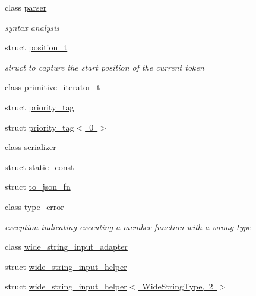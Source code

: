 \begin{DoxyCompactItemize}
class \mbox{\hyperlink{classnlohmann_1_1detail_1_1parser}{parser}}
\begin{DoxyCompactList}\small\item\em syntax analysis \end{DoxyCompactList}\item 
struct \mbox{\hyperlink{structnlohmann_1_1detail_1_1position__t}{position\+\_\+t}}
\begin{DoxyCompactList}\small\item\em struct to capture the start position of the current token \end{DoxyCompactList}\item 
class \mbox{\hyperlink{classnlohmann_1_1detail_1_1primitive__iterator__t}{primitive\+\_\+iterator\+\_\+t}}
\item 
struct \mbox{\hyperlink{structnlohmann_1_1detail_1_1priority__tag}{priority\+\_\+tag}}
\item 
struct \mbox{\hyperlink{structnlohmann_1_1detail_1_1priority__tag_3_010_01_4}{priority\+\_\+tag$<$ 0 $>$}}
\item 
class \mbox{\hyperlink{classnlohmann_1_1detail_1_1serializer}{serializer}}
\item 
struct \mbox{\hyperlink{structnlohmann_1_1detail_1_1static__const}{static\+\_\+const}}
\item 
struct \mbox{\hyperlink{structnlohmann_1_1detail_1_1to__json__fn}{to\+\_\+json\+\_\+fn}}
\item 
class \mbox{\hyperlink{classnlohmann_1_1detail_1_1type__error}{type\+\_\+error}}
\begin{DoxyCompactList}\small\item\em exception indicating executing a member function with a wrong type \end{DoxyCompactList}\item 
class \mbox{\hyperlink{classnlohmann_1_1detail_1_1wide__string__input__adapter}{wide\+\_\+string\+\_\+input\+\_\+adapter}}
\item 
struct \mbox{\hyperlink{structnlohmann_1_1detail_1_1wide__string__input__helper}{wide\+\_\+string\+\_\+input\+\_\+helper}}
\item 
struct \mbox{\hyperlink{structnlohmann_1_1detail_1_1wide__string__input__helper_3_01_wide_string_type_00_012_01_4}{wide\+\_\+string\+\_\+input\+\_\+helper$<$ Wide\+String\+Type, 2 $>$}}
\end{DoxyCompactItemize}
